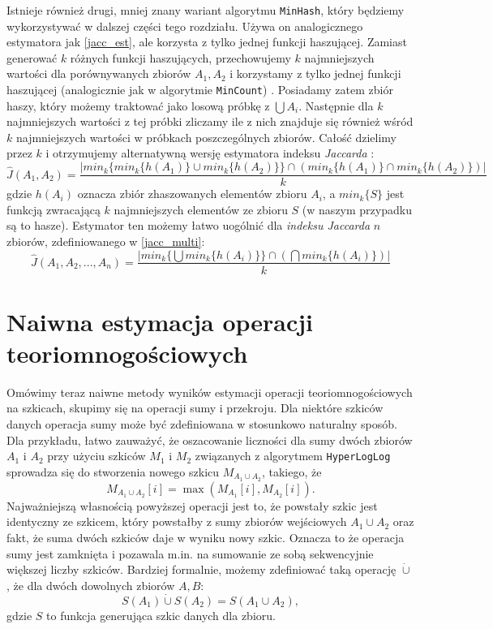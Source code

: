Istnieje również drugi, mniej znany wariant algorytmu \texttt{MinHash}, który będziemy wykorzystywać w dalszej części tego rozdziału.
 Używa on analogicznego estymatora jak \ref{jacc_est}, ale korzysta z tylko jednej funkcji haszującej. Zamiast generować $k$ różnych funkcji haszujących, przechowujemy $k$ najmniejszych wartości dla porównywanych zbiorów $A_1, A_2$ i korzystamy z tylko jednej funkcji haszującej (analogicznie jak w algorytmie \texttt{MinCount}) \cite{adroll}. Posiadamy zatem zbiór haszy, który możemy traktować jako losową próbkę z $\bigcup A_i$. Następnie dla $k$ najmniejszych wartości z tej próbki zliczamy ile z nich znajduje się również wśród $k$ najmniejszych wartości w próbkach poszczególnych zbiorów. Całość dzielimy przez $k$ i otrzymujemy alternatywną wersję estymatora indeksu \textit{Jaccarda} \cite{adroll}:
 \begin{equation}
 \hat{J}(A_1, A_2) = \frac{|min_{k}\{min_{k} \{ h(A_1) \} \cup min_{k} \{ h(A_2) \} \} \cap (min_{k}\{h(A_1)\} \cap min_{k}\{h(A_2)\})|}{k}
 \end{equation}
 gdzie $h(A_i)$ oznacza zbiór zhaszowanych elementów zbioru $A_i$, a $min_{k}\{S\}$ jest funkcją zwracającą $k$ najmniejszych elementów ze zbioru $S$ (w naszym przypadku są to hasze).
 Estymator ten możemy łatwo uogólnić dla \textit{indeksu Jaccarda} $n$ zbiorów, zdefiniowanego w \ref{jacc_multi}:
\begin{equation}
    \hat{J}(A_1, A_2, ..., A_n) = \frac{|min_{k}\{\bigcup min_{k} \{ h(A_i) \} \} \cap (\bigcap min_{k}\{h(A_i)\})|}{k}
\end{equation}

\section{Naiwna estymacja operacji teoriomnogościowych}

Omówimy teraz naiwne metody wyników estymacji operacji teoriomnogościowych na szkicach, skupimy się na operacji sumy i przekroju. Dla niektóre szkiców danych operacja sumy może być zdefiniowana w stosunkowo naturalny sposób. Dla przykładu, łatwo zauważyć, że  oszacowanie liczności dla sumy dwóch zbiorów $A_1$ i $A_2$ przy użyciu szkiców $M_1$ i $M_2$ związanych z algorytmem \texttt{HyperLogLog} sprowadza się do stworzenia nowego szkicu $M_{A_1\cup A_2}$, takiego, że 
$$M_{A_1\cup A_2}[i] = \max(M_{A_1}[i], M_{A_2}[i]).$$ 
Najważniejszą własnością powyższej operacji jest to, że powstały szkic jest identyczny ze szkicem, który powstałby z sumy zbiorów wejściowych $A_1\cup A_2$ oraz fakt, że suma dwóch szkiców daje w wyniku nowy szkic. Oznacza to że operacja sumy jest zamknięta i pozawala m.in. na sumowanie ze sobą sekwencyjnie większej liczby szkiców.
Bardziej formalnie, możemy zdefiniować taką operację $\dot{\cup}$, że dla dwóch dowolnych zbiorów $A, B$:
\begin{equation}
    S(A_1) \dot{\cup} S(A_2) = S(A_1 \cup A_2),
\end{equation}
gdzie $S$ to funkcja generująca szkic danych dla zbioru.

